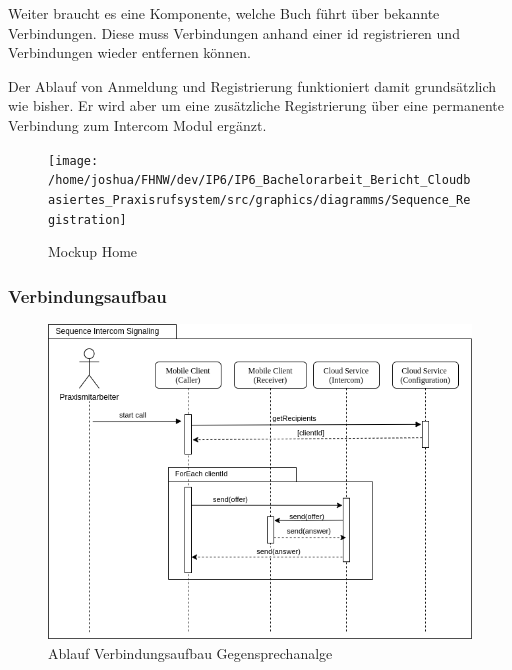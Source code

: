 \clearpage
Weiter braucht es eine Komponente, welche Buch führt über bekannte Verbindungen.
Diese muss Verbindungen anhand einer id registrieren und Verbindungen wieder entfernen können.



Der Ablauf von Anmeldung und Registrierung funktioniert damit grundsätzlich wie bisher.
Er wird aber um eine zusätzliche Registrierung über eine permanente Verbindung zum Intercom Modul ergänzt.

\begin{figure}[h]
    \centering
    \begin{minipage}[b]{0.9\textwidth}
        \texttt{[image: /home/joshua/FHNW/dev/IP6/IP6\_Bachelorarbeit\_Bericht\_Cloudbasiertes\_Praxisrufsystem/src/graphics/diagramms/Sequence\_Registration]}
        \caption{Mockup Home}
    \end{minipage}
\end{figure}


\clearpage

\subsubsection*{Verbindungsaufbau}

\begin{figure}[h]
    \centering
    \begin{minipage}[b]{0.9\textwidth}
        \includegraphics[width=\textwidth]{graphics/diagramms/Sequence_Intercom_Broking_V02}
        \caption{Ablauf Verbindungsaufbau Gegensprechanalge}
    \end{minipage}
\end{figure}

